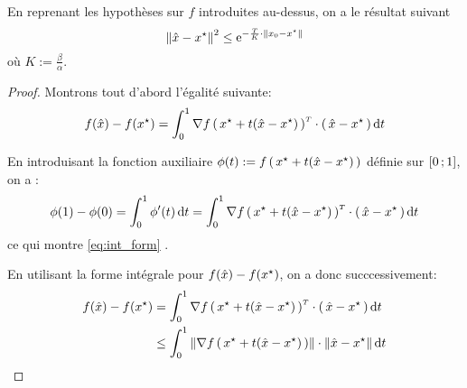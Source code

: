    \begin{theorem}
En reprenant les hypothèses sur $f$ introduites au-dessus, on a le résultat suivant
\begin{equation}
\norme{\xhat - \xopt}^2 \leq \e^{-\frac{T}{K} \cdot \norme{x_0-\xopt}}
\end{equation}
où $K := \frac{\beta}{\alpha}$.
   \end{theorem}

\begin{proof}
Montrons tout d'abord l'égalité suivante:
\begin{equation}
  f(\xhat)- f(\xopt) = \int_{0}^{1} \transpose{\grad f\prt{\xopt+t(\xhat-\xopt)}}
   \cdot \prt{\xhat- \xopt} \dt
\end{equation}

En introduisant la fonction auxiliaire $\phi(t):= f\prt{\xopt+t(\xhat-\xopt)}$ définie sur $\mathopen{[}0\mathpunct{};1\mathclose{]}$, on a :
\begin{equation*}\label{eq:int_form}
  \phi(1)-\phi(0)= \int_0^1 \phi^{\prime}(t) \dt = \int_{0}^{1} \transpose{\grad f\prt{\xopt+t(\xhat-\xopt)}}
   \cdot \prt{\xhat- \xopt} \dt
\end{equation*}
ce qui montre \eqref{eq:int_form} .

En utilisant la forme intégrale pour $f(\xhat)- f(\xopt)$, on a donc succcessivement:
\begin{align*}
f(\xhat)- f(\xopt) &= \int_{0}^{1} \transpose{\grad f\prt{\xopt+t(\xhat-\xopt)}}
 \cdot \prt{\xhat- \xopt} \dt\\
 &\leq \int_{0}^{1} \norme{\grad f\prt{\xopt+t(\xhat-\xopt)}}
  \cdot \norme{\xhat- \xopt} \dt
\end{align*}
\end{proof}
